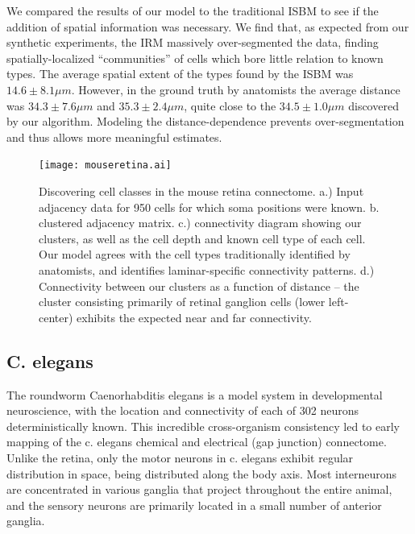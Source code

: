 \documentclass{article}
\begin{document}
We compared the results of our model to the traditional ISBM to see if
the addition of spatial information was necessary. We find that, as
expected from our synthetic experiments, the IRM massively
over-segmented the data, finding spatially-localized “communities” of
cells which bore little relation to known types.  The average spatial
extent of the types found by the ISBM was $14.6\pm8.1 \mu m$. However,
in the ground truth by anatomists the average distance was $34.3\pm7.6
\mu m$ and $35.3\pm 2.4 \mu m$, quite close to the $34.5\pm 1.0 \mu m$
discovered by our algorithm. Modeling the distance-dependence prevents
over-segmentation and thus allows more meaningful estimates.



\begin{figure}
  \centering 
  \centerline{\texttt{[image: mouseretina.ai]}}
  \caption{Discovering cell classes in the mouse retina connectome. 
a.) Input adjacency data for 950 cells for which soma positions were known. b. clustered adjacency matrix. c.) connectivity diagram showing our clusters, as
well as the cell depth and known cell type of each cell. Our model agrees
with the cell types traditionally identified by anatomists, and identifies 
laminar-specific connectivity patterns. d.) Connectivity between our
clusters as a function of distance -- the cluster consisting primarily of
retinal ganglion cells (lower left-center) exhibits the expected near and
far connectivity.}
\label{fig:mouseretina}
\end{figure}

\subsection{C. elegans}

The roundworm Caenorhabditis elegans is a model system in
developmental neuroscience\autocite{White1986}, with the location and
connectivity of each of 302 neurons deterministically known. This
incredible cross-organism consistency led to early mapping of the
c. elegans chemical and electrical (gap junction) connectome. Unlike
the retina, only the motor neurons in c. elegans exhibit regular
distribution in space, being distributed along the body axis. Most
interneurons are concentrated in various ganglia that project
throughout the entire animal, and the sensory neurons are primarily
located in a small number of anterior ganglia. 
\end{document}
